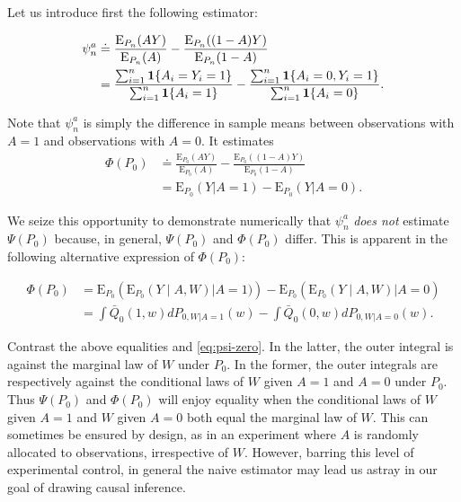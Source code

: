 \documentclass[11pt,openright,twoside]{book}
\newcommand{\defq}{\doteq}
\newcommand{\Exp}{\textrm{E}}
\newcommand{\one}{\textbf{1}}
\newcommand{\Qbar}{\bar{Q}}
\theoremstyle{definition}
\theoremstyle{definition}
\theoremstyle{definition}
\theoremstyle{remark}
\begin{document}
Let us introduce first the following estimator:

\begin{align}
\notag \psi_{n}^{a}
&\defq \frac{\Exp_{P_{n}} (AY)}{\Exp_{P_{n}} (A)} - \frac{\Exp_{P_{n}}
((1-A)Y)}{\Exp_{P_{n}}(1-A)} \\ 
&=          \frac{\sum_{i=1}^{n}         \one\{A_{i}=Y_{i}=1\}}{\sum_{i=1}^{n}
\one\{A_{i}=1\}}                     -                    \frac{\sum_{i=1}^{n}
\one\{A_{i}=0,Y_{i}=1\}}{\sum_{i=1}^{n}\one\{A_{i}=0\}}. \label{eq:cautionary} 
\end{align}

Note that \(\psi_n^a\) is simply the difference in sample means between
observations with \(A = 1\) and observations with \(A = 0\). It estimates
\begin{align*}\Phi(P_{0}) &\defq \frac{\Exp_{P_{0}}
(AY)}{\Exp_{P_{0}} (A)} - \frac{\Exp_{P_{0}} ((1-A)Y)}{\Exp_{P_{0}} (1-A)}\\&=
\Exp_{P_{0}} (Y | A=1) - \Exp_{P_{0}} (Y | A=0).\end{align*}

We seize this opportunity to demonstrate numerically that
\(\psi_{n}^{a}\) \emph{does not} estimate \(\Psi(P_{0})\) because, in general,
\(\Psi(P_{0})\) and \(\Phi(P_{0})\) differ. This is apparent in the following
alternative expression of \(\Phi(P_{0})\):

\begin{align*} \Phi(P_{0}) &= \Exp_{P_{0}} \left(\Exp_{P_0}(Y \mid A, W) |A=1)
\right) -  \Exp_{P_{0}} \left(\Exp_{P_0}(Y \mid  A, W) | A=0\right)\\  &= \int
\Qbar_{0}(1, w) dP_{0,W|A=1}(w) - \int \Qbar_{0}(0, w) dP_{0,W|A=0}(w).
\end{align*}

Contrast the above equalities and \eqref{eq:psi-zero}. In the latter, the
outer integral is against the marginal law of \(W\) under \(P_{0}\). In the
former, the outer integrals are respectively against the conditional laws of
\(W\) given \(A=1\) and \(A=0\) under \(P_{0}\). Thus \(\Psi(P_0)\) and \(\Phi(P_0)\) will
enjoy equality when the conditional laws of \(W\) given \(A = 1\) and \(W\) given
\(A = 0\) both equal the marginal law of \(W\). This can sometimes be
ensured by design, as in an experiment where \(A\) is randomly allocated to
observations, irrespective of \(W\). However, barring this level of experimental
control, in general the naive estimator may lead us astray in our goal of
drawing causal inference.
\end{document}
